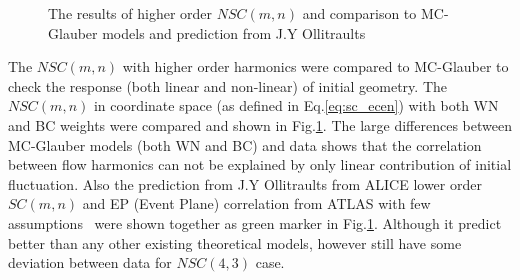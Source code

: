 \begin{figure}[h]
\begin{center}
        \caption{The results of  higher order $NSC(m,n)$ and comparison to MC-Glauber models and prediction from J.Y Ollitraults \cite{Giacalone:2016afq}  }
        \label{fig_sc_higher:glauber}
        \end{center}   
     \end{figure}

 The $NSC(m,n)$ with higher order harmonics were compared to MC-Glauber to check the response (both linear and non-linear) of initial geometry. The $NSC(m,n)$ in coordinate space (as defined in Eq.\ref{eq:sc_ecen}) with both WN and BC weights were compared and shown in Fig.\ref{fig_sc_higher:glauber}. The large differences between MC-Glauber models (both WN and BC) and data shows that the correlation between flow harmonics can not be explained by only linear contribution of initial fluctuation. Also the prediction from J.Y Ollitraults from ALICE lower order $SC(m,n)$ and EP (Event Plane) correlation from ATLAS with few assumptions~\cite{Giacalone:2016afq} were shown together as green marker in Fig.\ref{fig_sc_higher:glauber}. Although it predict better than any other existing theoretical models, however still have some deviation between data for $NSC(4,3)$ case.
 

